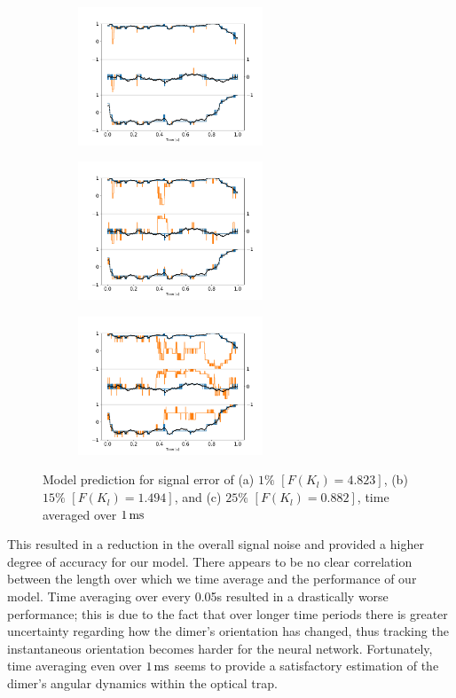 \documentclass[12pt]{spieman}
\begin{document}
\begin{spacing}{1.5}
\begin{figure}[h]
	\centering
	\begin{subfigure}{0.32\textwidth}
		\subcaption{}
		\includegraphics[width=5.5cm]{./Images/fig11a.png}
	\end{subfigure}
	\begin{subfigure}{0.32\textwidth}
		\subcaption{}
		\includegraphics[width=5.5cm]{./Images/fig11b.png}
	\end{subfigure}
	\begin{subfigure}{0.32\textwidth}
		\subcaption{}
		\includegraphics[width=5.5cm]{./Images/fig11c.png}
	\end{subfigure}
	\caption{Model prediction for signal error of (a) $1\%$ $[F(K_l)=4.823]$,  (b) $15\%$ $[F(K_l)=1.494]$, and (c) $25\%$ $[F(K_l)=0.882]$, time averaged over $1\,{\rm ms}$}
	\label{fig:time average}
\end{figure}
This resulted in a reduction in the overall signal noise and provided a higher degree of accuracy for our model. There appears to be no clear correlation between the length over which we time average and the performance of our model. Time averaging over every 0.05s resulted in a drastically worse performance; this is due to the fact that over longer time periods there is greater uncertainty regarding how the dimer's orientation has changed, thus tracking the instantaneous orientation becomes harder for the neural network. Fortunately, time averaging even over $1\,{\rm ms}$ seems to provide a satisfactory estimation of the dimer's angular dynamics within the optical trap.


\end{spacing}
\end{document}
